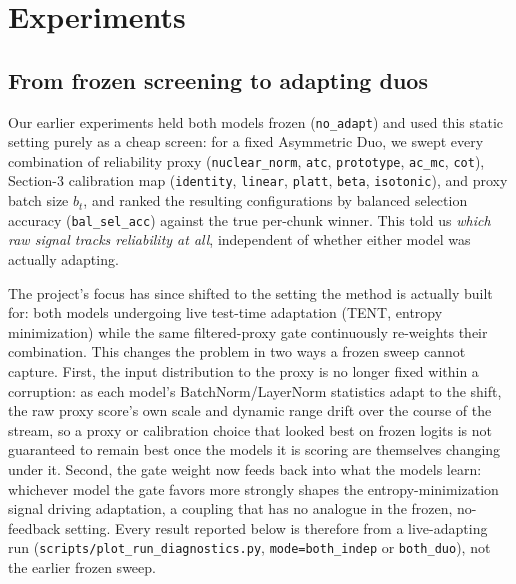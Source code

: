 
\section{Experiments}
\label{sec:experiments}

\subsection{From frozen screening to adapting duos}
\label{sec:experiments:shift}

Our earlier experiments held both models frozen (\texttt{no\_adapt}) and used
this static setting purely as a cheap screen: for a fixed Asymmetric Duo, we
swept every combination of reliability proxy (\texttt{nuclear\_norm},
\texttt{atc}, \texttt{prototype}, \texttt{ac\_mc}, \texttt{cot}), Section-3
calibration map (\texttt{identity}, \texttt{linear}, \texttt{platt},
\texttt{beta}, \texttt{isotonic}), and proxy batch size $b_t$, and ranked the
resulting configurations by balanced selection accuracy
(\texttt{bal\_sel\_acc}) against the true per-chunk winner. This told us
\emph{which raw signal tracks reliability at all}, independent of whether
either model was actually adapting.

The project's focus has since shifted to the setting the method is actually
built for: both models undergoing live test-time adaptation (TENT, entropy
minimization) while the same filtered-proxy gate continuously re-weights
their combination. This changes the problem in two ways a frozen sweep
cannot capture. First, the input distribution to the proxy is no longer
fixed within a corruption: as each model's BatchNorm/LayerNorm statistics
adapt to the shift, the raw proxy score's own scale and dynamic range drift
over the course of the stream, so a proxy or calibration choice that looked
best on frozen logits is not guaranteed to remain best once the models it is
scoring are themselves changing under it. Second, the gate weight now feeds
back into what the models learn: whichever model the gate favors more
strongly shapes the entropy-minimization signal driving adaptation, a
coupling that has no analogue in the frozen, no-feedback setting. Every
result reported below is therefore from a live-adapting run
(\texttt{scripts/plot\_run\_diagnostics.py}, \texttt{mode=both\_indep} or
\texttt{both\_duo}), not the earlier frozen sweep.

